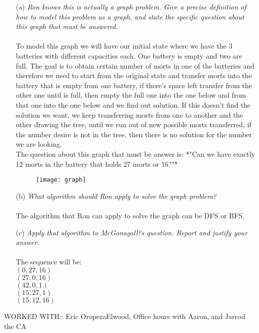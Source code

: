 \documentclass[12pt]{article} \setlength{\oddsidemargin}{0in}
\begin{document}
\begin{enumerate}
\item[(a)]{\textit{Ron knows this is actually a graph problem. Give a
      precise definition of how to model this problem as a graph, and
      state the specific question about this graph that must be
      answered.}}
  \\\\
  To model this graph we will have our initial state where we have the 3 batteries with different capacities each. One battery is empty and two are full. The goal is to obtain certain number of morts in one of the batteries and therefore we need to start from the original state and transfer morts into the battery that is empty from one battery, if there's  space left transfer from the other one until is full, then empty the full one into the one below and from that one into the one below and we find out solution. If this doesn't find the solution we want, we keep transferring morts from one to another and the other drawing the tree, until we run out of new possible morts transferred, if the number desire is not in the tree, then there is no solution for the number we are looking.\\
  The question about this graph that must be answer is: *"Can we have exactly 12 morts in the battery that holds 27 morts or 16?"*
\begin{figure}[h]
  \centering \texttt{[image: graph]}
\end{figure} 
\newpage
\item[(b)]{\textit{What algorithm should Ron apply to solve the graph
      problem?}}
  \\\\
  The algorithm that Ron can apply to solve the graph can be DFS or BFS. 
  \\
\item[(c)]{\textit{Apply that algorithm to McGonagall?s
      question. Report and justify your answer.}}
  \\\\
  The sequence will be:\\
  $(0, 27, 16)$\\
  $(27, 0, 16)$\\
  $(42, 0, 1)$\\
  $(15, 27, 1)$\\
  $(15, 12, 16)$\\ 

\end{enumerate}
  
  
  WORKED WITH:: Eric OropezaElwood, Office hours with Aaron, and Jarrod the CA
\end{document}
